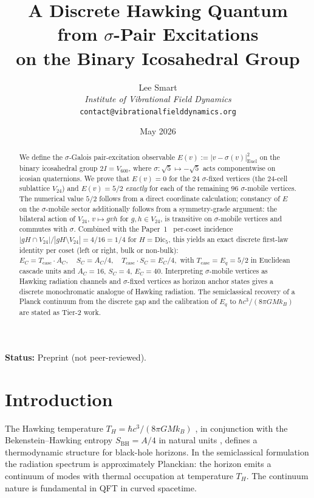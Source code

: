 \documentclass[11pt]{article}
\title{A Discrete Hawking Quantum from $\sigma$-Pair Excitations\\
       on the Binary Icosahedral Group}
\author{%
  Lee Smart \\[3pt]
  \textit{Institute of Vibrational Field Dynamics} \\[2pt]
  \texttt{contact@vibrationalfielddynamics.org}}
\date{May 2026}
\newcommand{\twoI}{2I}
\newcommand{\Vsixhundred}{V_{600}}
\newcommand{\Dicfive}{\mathrm{Dic}_5}
\newcommand{\Vtwentyfour}{V_{24}}
\newcommand{\sigmaG}{\sigma}
\newcommand{\Eq}{E_q}
\newcommand{\Tcasc}{T_{\mathrm{casc}}}
\begin{document}
\maketitle

\noindent\textbf{Status:} Preprint (not peer-reviewed).

\begin{abstract}
We define the $\sigma$-Galois pair-excitation observable
$E(v) := |v - \sigmaG(v)|^2_{\mathrm{Eucl}}$ on the binary icosahedral
group $\twoI = \Vsixhundred$, where $\sigmaG : \sqrt{5} \mapsto -\sqrt{5}$
acts componentwise on icosian quaternions. We prove that
$E(v) = 0$ for the $24$ $\sigmaG$-fixed vertices (the $24$-cell sublattice
$\Vtwentyfour$) and $E(v) = 5/2$ \emph{exactly} for each of the
remaining $96$ $\sigmaG$-mobile vertices. The numerical value $5/2$
follows from a direct coordinate calculation; constancy of $E$ on the
$\sigmaG$-mobile sector additionally follows from a symmetry-grade
argument: the bilateral action of $\Vtwentyfour$,
$v \mapsto g v h$ for $g, h \in \Vtwentyfour$, is transitive on
$\sigmaG$-mobile vertices and commutes with $\sigmaG$.
Combined with the Paper~1~\citep{V600Paper1} per-coset incidence
$|gH \cap \Vtwentyfour|/|gH \setminus \Vtwentyfour| = 4/16 = 1/4$ for
$H = \Dicfive$, this yields an exact discrete first-law identity per
coset (left or right, bulk or non-bulk):
\(
  E_C = \Tcasc \cdot A_C, \quad S_C = A_C/4, \quad
  \Tcasc \cdot S_C = E_C / 4,
\)
with $\Tcasc = \Eq = 5/2$ in Euclidean cascade units and $A_C = 16$,
$S_C = 4$, $E_C = 40$. Interpreting $\sigmaG$-mobile vertices as Hawking radiation
channels and $\sigmaG$-fixed vertices as horizon anchor states gives a
discrete monochromatic analogue of Hawking radiation. The semiclassical
recovery of a Planck continuum from the discrete gap and the calibration
of $\Eq$ to $\hbar c^3 / (8 \pi G M k_B)$ are stated as Tier-2 work.
\end{abstract}

\section{Introduction}\label{sec:intro}

The Hawking temperature $T_H = \hbar c^3/(8 \pi G M k_B)$
\citep{Hawking1975}, in conjunction with the Bekenstein--Hawking entropy
$S_{\mathrm{BH}} = A/4$ in natural units \citep{Bekenstein1973}, defines
a thermodynamic structure for black-hole horizons. In the semiclassical
formulation the radiation spectrum is approximately Planckian: the
horizon emits a continuum of modes with thermal occupation at temperature
$T_H$. The continuum nature is fundamental in QFT in curved spacetime.
\end{document}
